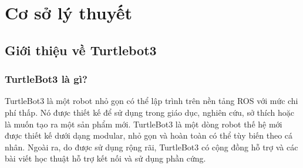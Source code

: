 \chapter{Cơ sở lý thuyết}
\section{Giới thiệu về Turtlebot3}
\subsection{TurtleBot3 là gì?}
\tab TurtleBot3 là một robot nhỏ gọn có thể lập trình trên nền tảng ROS với mức chi phí thấp. Nó được thiết kế để sử dụng trong giáo dục, nghiên cứu, sở thích hoặc là muốn tạo ra một sản phẩm mới. TurtleBot3 là một dòng robot thế hệ mới được thiết kế dưới dạng modular, nhỏ gọn và hoàn toàn có thể tùy biến theo cá nhân. Ngoài ra, do được sử dụng rộng rãi, TurtleBot3 có cộng đồng hỗ trợ và các bài viết học thuật hỗ trợ kết nối và sử dụng phần cứng.

